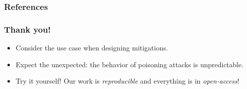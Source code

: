 \documentclass[color,t,presentation,english,aspectratio=169]{beamer}
\begin{document}
\begin{frame}[allowframebreaks]
	\frametitle{References}
	\printbibliography
\end{frame}

\begin{frame}
	\frametitle{Thank you!}
	\vspace{1ex}

	\begin{itemize}
		\item Consider the use case when designing mitigations.
		\item Expect the unexpected: the behavior of poisoning attacks is unpredictable.
		\item Try it yourself! Our work is \emph{reproducible} and everything is in \emph{open-access}!
	\end{itemize}\vspace{2ex}


\end{frame}
\end{document}
